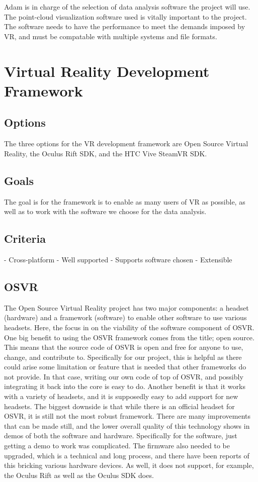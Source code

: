 \documentclass{article}
\begin{document}
Adam is in charge of the selection of data analysis software the project will use.
The point-cloud visualization software used is vitally important to the project.
The software needs to have the performance to meet the demands imposed by VR, and must be compatable with multiple systems and file formats.

\section{Virtual Reality Development Framework}

\subsection{Options}
The three options for the VR development framework are Open Source Virtual Reality, the Oculus Rift SDK,
and the HTC Vive SteamVR SDK.

\subsection{Goals}
The goal is for the framework is to enable as many users of VR as possible, as well as to work with
the software we choose for the data analysis. 

\subsection{Criteria}
- Cross-platform
- Well supported
- Supports software chosen
- Extensible

\subsection{OSVR}
The Open Source Virtual Reality project has two major components: a headset (hardware) and a framework (software) to enable
other software to use various headsets. Here, the focus in on the viability of the software component of OSVR. 
One big benefit to using the OSVR framework comes from the title; open source. This means that the source code
of OSVR is open and free for anyone to use, change, and contribute to. Specifically for our project, this is helpful
as there could arise some limitation or feature that is needed that other frameworks do not provide. In that case,
writing our own code of top of OSVR, and possibly integrating it back into the core is easy to do. Another benefit
is that it works with a variety of headsets, and it is supposedly easy to add support for new headsets.
The biggest downside is that while there is an official headset for OSVR, it is still not the most robust framework.
There are many improvements that can be made still, and the lower overall quality of this technology shows in demos
of both the software and hardware. Specifically for the software, just getting a demo to work was complicated. The firmware
also needed to be upgraded, which is a technical and long process, and there have been reports of this bricking various
hardware devices. As well, it does not support, for example, the Oculus Rift as well as the Oculus SDK does. \cite{osvrsoft}
\end{document}
